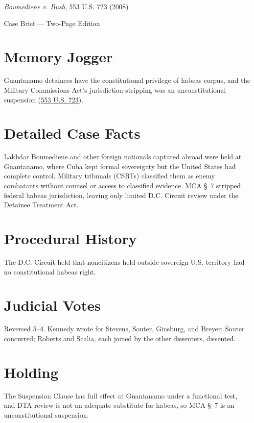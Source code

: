 \documentclass[12pt]{article}
\begin{document}
\begin{center}
{\LARGE \textit{Boumediene v. Bush}, 553 U.S. 723 (2008)\par}
\vspace{0.5em}
{\large Case Brief --- Two-Page Edition\par}
\end{center}

\section{Memory Jogger}
Guantanamo detainees have the constitutional privilege of habeas corpus, and the Military Commissions Act's jurisdiction-stripping was an unconstitutional suspension (\href{https://supreme.justia.com/cases/federal/us/553/723/}{553 U.S. 723}).

\section{Detailed Case Facts}
Lakhdar Boumediene and other foreign nationals captured abroad were held at Guantanamo, where Cuba kept formal sovereignty but the United States had complete control. Military tribunals (CSRTs) classified them as enemy combatants without counsel or access to classified evidence. MCA \S~7 stripped federal habeas jurisdiction, leaving only limited D.C. Circuit review under the Detainee Treatment Act.

\section{Procedural History}
The D.C. Circuit held that noncitizens held outside sovereign U.S. territory had no constitutional habeas right.

\section{Judicial Votes}
Reversed 5--4. Kennedy wrote for Stevens, Souter, Ginsburg, and Breyer; Souter concurred; Roberts and Scalia, each joined by the other dissenters, dissented.

\section{Holding}
The Suspension Clause has full effect at Guantanamo under a functional test, and DTA review is not an adequate substitute for habeas, so MCA \S~7 is an unconstitutional suspension.
\end{document}
